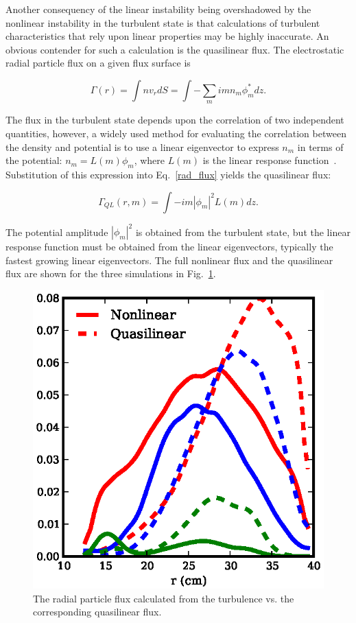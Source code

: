 \documentclass[showpacs,preprintnumbers,amsmath,amssymb,superscriptaddress,aip]{revtex4-1}
\def\beq{\begin{equation}}
\def\eeq{\end{equation}}
\begin{document}
Another consequency of the linear instability being overshadowed by the nonlinear instability in the turbulent state is that calculations of turbulent characteristics that rely upon linear properties may be
highly inaccurate. An obvious contender for such a calculation is the quasilinear flux.
The electrostatic radial particle flux on a given flux surface is

\beq
\label{rad_flux}
\Gamma(r) = \int n v_r dS = \int - \sum_m i m n_m \phi_m^* dz.
\eeq

The flux in the turbulent state depends upon the correlation of two independent quantities, however, a widely used method for evaluating the correlation between the density and potential is
to use a linear eigenvector to express $n_m$ in terms of the potential: $n_m = L(m) \phi_m$, where $L(m)$ is the linear response function~\cite{terry2006a}. 
Substitution of this expression into Eq.~\ref{rad_flux} yields the quasilinear flux:

\beq
\label{ql_flux}
\Gamma_{QL}(r,m) = \int - i m |\phi_m|^2 L(m) dz.
\eeq

The potential amplitude $|\phi_m|^2$ is obtained from the turbulent state, but the linear response function must be obtained from the linear eigenvectors, typically the fastest growing
linear eigenvectors. The full nonlinear flux and the quasilinear flux are shown for the three simulations in Fig.~\ref{flux_comparison}.

\begin{figure}[!htbp]
\includegraphics[]{flux_comparison}
\hfil
\caption{The radial particle flux calculated from the turbulence vs. the corresponding quasilinear flux.}
\label{flux_comparison}
\end{figure}
\end{document}
